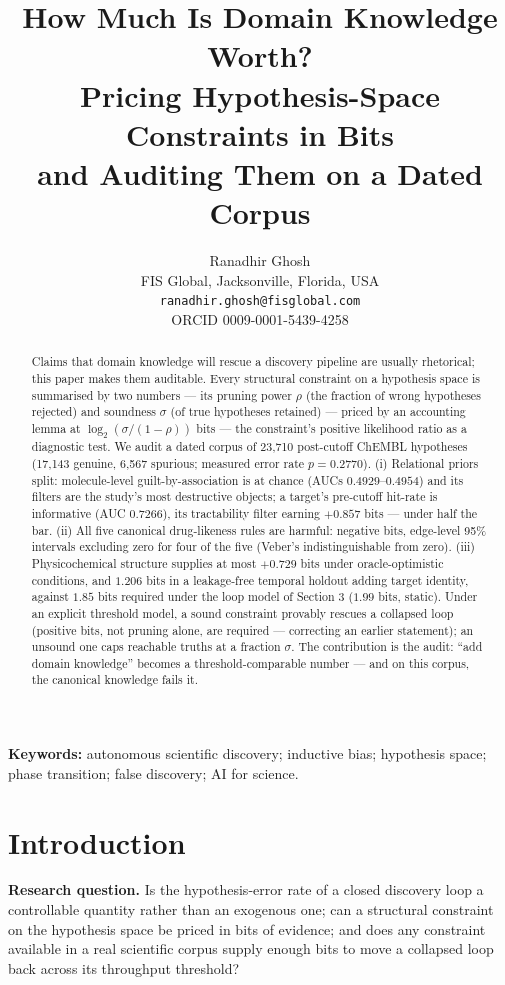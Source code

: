 \documentclass[11pt]{article}
\title{How Much Is Domain Knowledge Worth?\\ Pricing Hypothesis-Space Constraints in Bits\\ and Auditing Them on a Dated Corpus}
\author{Ranadhir Ghosh\\
FIS Global, Jacksonville, Florida, USA\\
\texttt{ranadhir.ghosh@fisglobal.com}\\
ORCID 0009-0001-5439-4258}
\date{}
\begin{document}
\maketitle

\begin{abstract}
Claims that domain knowledge will rescue a discovery pipeline are usually
rhetorical; this paper makes them auditable. Every structural constraint on
a hypothesis space is summarised by two numbers --- its pruning power
$\rho$ (the fraction of wrong hypotheses rejected) and soundness $\sigma$
(of true hypotheses retained) --- priced by an accounting lemma at
$\log_2(\sigma/(1-\rho))$ bits --- the constraint's positive likelihood
ratio as a diagnostic test. We audit a dated corpus of 23{,}710 post-cutoff
ChEMBL hypotheses (17{,}143 genuine, 6{,}567 spurious; measured error rate $p = 0.2770$).
(i) Relational priors split: molecule-level
guilt-by-association is at chance (AUCs $0.4929$--$0.4954$) and its filters
are the study's most destructive objects; a target's pre-cutoff hit-rate is
informative (AUC $0.7266$), its tractability filter earning $+0.857$ bits
--- under half the bar. (ii) All five canonical drug-likeness rules are
harmful: negative bits, edge-level 95\% intervals excluding zero for four
of the five (Veber's indistinguishable from zero). (iii) Physicochemical
structure supplies at most $+0.729$ bits under oracle-optimistic
conditions, and $1.206$ bits in a leakage-free temporal holdout adding
target identity, against $1.85$ bits required under the loop model of
Section 3 ($1.99$ bits, static). Under an explicit threshold model, a sound
constraint provably rescues a collapsed loop (positive bits, not pruning
alone, are required --- correcting an earlier statement); an unsound one
caps reachable truths at a fraction $\sigma$. The contribution is the
audit: ``add domain knowledge'' becomes a threshold-comparable number ---
and on this corpus, the canonical knowledge fails it.
\end{abstract}

\noindent\textbf{Keywords:} autonomous scientific discovery; inductive bias;
hypothesis space; phase transition; false discovery; AI for science.

\section{Introduction}

\textbf{Research question.} Is the hypothesis-error rate of a closed
discovery loop a controllable quantity rather than an exogenous one; can a
structural constraint on the hypothesis space be priced in bits of evidence;
and does any constraint available in a real scientific corpus supply enough
bits to move a collapsed loop back across its throughput threshold?
\end{document}
